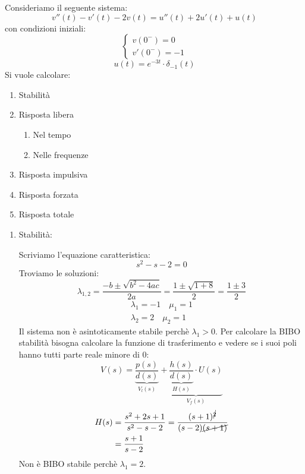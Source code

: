 \documentclass[a4paper]{article}
\begin{document}
\begin{example}
  Consideriamo il seguente sistema:
  \[
  v''(t) - v'(t) -2v(t) = u''(t) + 2u'(t) + u(t)
  \] 
  con condizioni iniziali:
  \[
  \begin{cases}
    v(0^-) = 0\\
    v'(0^-) = -1
  \end{cases}
  \] 
  \[
    u(t) = e^{-3t} \cdot \delta_{-1}(t)
  \] 
  Si vuole calcolare:
  \begin{enumerate}
    \item Stabilità
    \item Risposta libera
      \begin{enumerate}
        \item Nel tempo
        \item Nelle frequenze
      \end{enumerate}
    \item Risposta impulsiva
    \item Risposta forzata
    \item Risposta totale
  \end{enumerate}

  \vspace{1em}
  \noindent
  \begin{enumerate}
    \item Stabilità:

      \vspace{1em}
      \noindent
      Scriviamo l'equazione caratteristica:
      \[
      s^2-s-2 = 0
      \] 
      Troviamo le soluzioni:
      \[
        \lambda_{1,2} = \frac{-b \pm \sqrt{b^2-4ac}}{2a} = \frac{1 \pm \sqrt{1+8}}{2} = \frac{1 \pm 3}{2}
      \] 
      \[
      \begin{aligned}
        \lambda_1 = -1 \quad \mu_1 = 1\\
        \lambda_2 = 2 \quad \mu_2 = 1
      \end{aligned}
      \] 
      Il sistema non è asintoticamente stabile perchè \( \lambda_1 > 0 \).
      Per calcolare la BIBO stabilità bisogna calcolare la funzione di trasferimento e
      vedere se i suoi poli hanno tutti parte reale minore di 0:
      \[
        V(s) = \underbrace{\frac{p(s)}{d(s)}}_{V_l(s)} + 
        \underbrace{\underbrace{\frac{h(s)}{d(s)}}_{H(s)} \cdot U(s)}_{V_f(s)}
      \] 
      \[
        \begin{aligned}
          H(s) &= \frac{s^2+2s+1}{s^2-s-2} = \frac{(s+1)^{\cancel{2}}}{(s-2)\cancel{(s+1)}}\\
               &= \frac{s+1}{s-2}
        \end{aligned}
      \] 
      Non è BIBO stabile perchè \( \lambda_1 = 2 \).


\end{enumerate}
\end{example}
\end{document}
